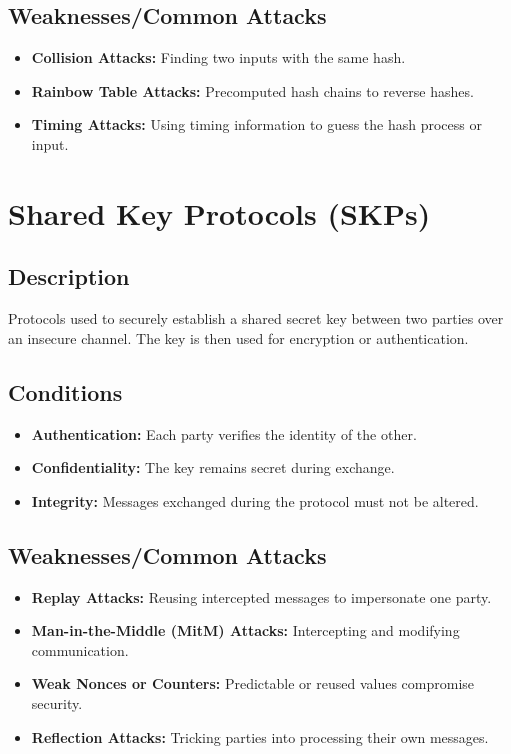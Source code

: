 \documentclass[12pt]{article}
\begin{document}
\subsection*{Weaknesses/Common Attacks}
\begin{itemize}
    \item \textbf{Collision Attacks:} Finding two inputs with the same hash.
    \item \textbf{Rainbow Table Attacks:} Precomputed hash chains to reverse hashes.
    \item \textbf{Timing Attacks:} Using timing information to guess the hash process or input.
\end{itemize}

\section*{Shared Key Protocols (SKPs)}
\subsection*{Description}
Protocols used to securely establish a shared secret key between two parties over an insecure channel. The key is then used for encryption or authentication.

\subsection*{Conditions}
\begin{itemize}
    \item \textbf{Authentication:} Each party verifies the identity of the other.
    \item \textbf{Confidentiality:} The key remains secret during exchange.
    \item \textbf{Integrity:} Messages exchanged during the protocol must not be altered.
\end{itemize}

\subsection*{Weaknesses/Common Attacks}
\begin{itemize}
    \item \textbf{Replay Attacks:} Reusing intercepted messages to impersonate one party.
    \item \textbf{Man-in-the-Middle (MitM) Attacks:} Intercepting and modifying communication.
    \item \textbf{Weak Nonces or Counters:} Predictable or reused values compromise security.
    \item \textbf{Reflection Attacks:} Tricking parties into processing their own messages.
\end{itemize}
\end{document}
